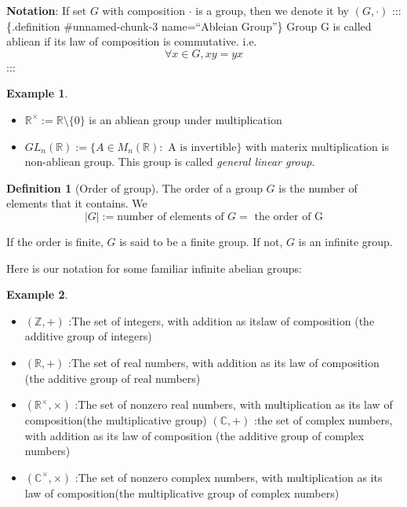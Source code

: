 \documentclass[
]{book}
\providecommand{\tightlist}{%
  \setlength{\itemsep}{0pt}\setlength{\parskip}{0pt}}
\theoremstyle{definition}
\newtheorem{definition}{Definition}[chapter]
\theoremstyle{definition}
\newtheorem{example}{Example}[chapter]
\theoremstyle{definition}
\theoremstyle{definition}
\theoremstyle{remark}
\begin{document}
\textbf{Notation}: If set \(G\) with composition \(\cdot\) is a group, then we denote it by \((G,\cdot)\)
::: \{.definition \#unnamed-chunk-3 name=``Ableian Group''\}
Group G is called abliean if its law of composition is commutative. i.e.
\[\forall x\in G, xy=yx\]
:::

\begin{example}
\protect\hypertarget{exm:unnamed-chunk-4}{}\label{exm:unnamed-chunk-4}\leavevmode

\begin{itemize}
\tightlist
\item
  \(\mathbb{R}^\times:=\mathbb{R}\setminus \{0\}\) is an abliean group under multiplication
\item
  \(GL_n(\mathbb{R}):=\{A\in M_n(\mathbb{R}): \text{ A is invertible}\}\) with materix multiplication is non-abliean group. This group is called \emph{general linear group}.
\end{itemize}

\end{example}

\begin{definition}[Order of group]
\protect\hypertarget{def:unnamed-chunk-5}{}\label{def:unnamed-chunk-5}The order of a group \(G\) is the number of elements that it contains. We \[| G | := \text{number of elements of }G=\text{ the order of G}\]

If the order is finite, \(G\) is said to be a finite group. If not, \(G\) is an infinite group.
\end{definition}

Here is our notation for some familiar infinite abelian groups:

\begin{example}
\protect\hypertarget{exm:unnamed-chunk-6}{}\label{exm:unnamed-chunk-6}\leavevmode

\begin{itemize}
\tightlist
\item
  \((\mathbb{Z},+)\) :The set of integers, with addition as itslaw of composition (the additive group of integers)
\item
  \((\mathbb{R},+)\) :The set of real numbers, with addition as its law of
  composition (the additive group of real numbers)
\item
  \((\mathbb{R}^\times,\times)\) :The set of nonzero real numbers, with multiplication as its law of composition(the multiplicative group)
  \((\mathbb{C},+)\) :the set of complex numbers, with addition as its law of composition (the additive group of complex numbers)
\item
  \((\mathbb{C}^\times,\times)\) :The set of nonzero complex numbers, with multiplication as its law of composition(the multiplicative group of complex numbers)
\end{itemize}

\end{example}
\end{document}
